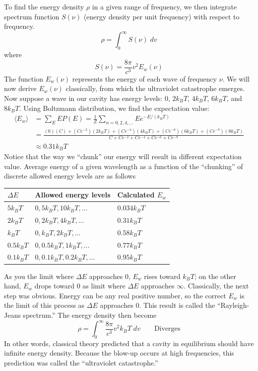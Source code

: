 \documentclass[../../../main.tex]{subfiles}
\begin{document}
To find the energy density $\rho$ in a given range of frequency, we then integrate spectrum function $S(\nu)$ (energy density per unit frequency) with respect to frequency. 
\begin{equation*}
    \rho=\int_{0}^{\infty}S(\nu)\;dv
\end{equation*}
where
\begin{equation*}
    S(\nu)=\frac{8\pi}{c^3}v^2E_w(\nu)
\end{equation*}
The function $E_w(\nu)$ represents the energy of each wave of frequency $\nu$. We will now derive $E_w(\nu)$ classically, from which the ultraviolet catastrophe emerges. Now suppose a wave in our cavity has energy levels: $0$, $2k_B T$, $4k_B T$, $6k_B T$, and $8k_B T$. Using Boltzmann distribution, we find the expectation value:
\begin{align*}
    \langle E_w\rangle&=\sum_{E}^{}EP(E)=\frac{1}{Z}\sum_{n=0,2,4,\dots}^{}Ee^{-E/(k_BT)}\\
    &=\frac{(0)(C)+(Ce^{-2})(2k_B T)+(Ce^{-4})(4k_B T)+(Ce^{-6})(6k_B T)+(Ce^{-8})(8k_B T)}{C+Ce^{-2}+Ce^{-4}+Ce^{-6}+Ce^{-8}}\\
    &\approx 0.31k_B T
\end{align*}
Notice that the way we “chunk” our energy will result in different expectation value. Average energy of a given wavelength as a function of the “chunking” of discrete allowed energy levels are as follows
\begin{center}
    \begin{longtable}{|p{}|p{}|p{}|}
        \hline
        $\Delta E$&Allowed energy levels&Calculated $E_w$\\\hline\hline
        $5k_B T$&$0, 5k_B T, 10k_B T, \dots$&$0.034k_B T$\\
        $2k_B T$&$0, 2k_B T, 4k_B T, \dots$&$0.31k_B T$\\
        $k_B T$&$0, k_B T, 2k_B T, \dots$&$0.58k_B T$\\
        $0.5k_B T$&$0, 0.5k_B T, 1k_B T, \dots$&$0.77k_B T$\\
        $0.1k_B T$&$0, 0.1k_B T, 0.2k_B T, \dots$&$0.95k_B T$\\\hline
    \end{longtable}
\end{center}
As you the limit where $\Delta E$ approaches $0$, $E_w$ rises toward $k_B T$; on the other hand, $E_w$ drops toward $0$ as limit where $\Delta E$ approaches $\infty$. Classically, the next step was obvious. Energy can be any real positive number, so the correct $E_w$ is the limit of this process as $\Delta E$ approaches $0$. This result is called the “Rayleigh-Jeans spectrum.” The energy density then become
\begin{equation*}
    \rho=\int_{0}^{\infty}\frac{8\pi}{c^3}v^2k_B T\;dv\qquad\text{Diverges}
\end{equation*}
In other words, classical theory predicted that a cavity in equilibrium should have infinite energy density. Because the blow-up occurs at high frequencies, this prediction was called the “ultraviolet catastrophe.”
\end{document}
